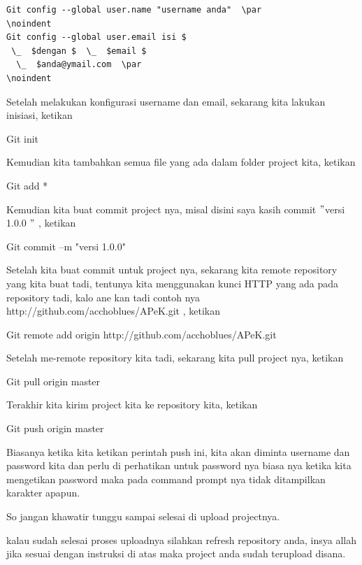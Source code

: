 \begin{verbatim}
Git config --global user.name "username anda"  \par
\noindent 
Git config --global user.email isi $ 
 \_  $dengan $  \_  $email $ 
  \_  $anda@ymail.com  \par
\noindent 
\end{verbatim}
Setelah melakukan konfigurasi username dan email, sekarang kita lakukan inisiasi, ketikan  \par
\noindent 
Git init  \par
\noindent 
Kemudian kita tambahkan semua file yang ada dalam folder project kita, ketikan  \par
\noindent 
Git add *  \par
\noindent 
Kemudian kita buat commit project nya, misal disini saya kasih commit  $ " $versi 1.0.0 $ " $ , ketikan  \par
\noindent 
Git commit –m "versi 1.0.0"  \par
\noindent 
Setelah kita buat commit untuk project nya, sekarang kita remote repository yang kita buat tadi, tentunya kita menggunakan kunci HTTP yang ada pada repository tadi, kalo ane kan tadi contoh nya http://github.com/acchoblues/APeK.git , ketikan \par
\noindent 
Git remote add origin http://github.com/acchoblues/APeK.git  \par
\noindent 
Setelah me-remote repository kita tadi, sekarang kita pull project nya, ketikan  \par
\noindent 
Git pull origin master  \par
\noindent 
Terakhir kita kirim project kita ke repository kita, ketikan  \par
\noindent 
Git push origin master  \par
\noindent 
Biasanya ketika kita ketikan perintah push ini, kita akan diminta username dan password kita dan perlu di perhatikan untuk password nya biasa nya ketika kita mengetikan password maka pada command prompt nya tidak ditampilkan karakter apapun. \par
\noindent 
So jangan khawatir tunggu sampai selesai di upload projectnya. \par
\noindent 
kalau sudah selesai proses uploadnya silahkan refresh repository anda, insya allah jika sesuai dengan instruksi di atas maka project anda sudah terupload disana. \par
\vspace{12pt}
\vspace{12pt}


